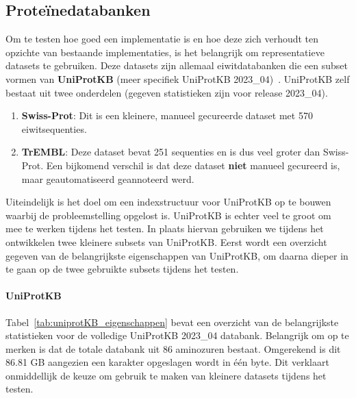\subsection{Proteïnedatabanken}\label{subsec:proteine-databanken}
Om te testen hoe goed een implementatie is en hoe deze zich verhoudt ten opzichte van bestaande implementaties, is het belangrijk om representatieve datasets te gebruiken.
Deze datasets zijn allemaal eiwitdatabanken die een subset vormen van \textbf{UniProtKB} (meer specifiek UniProtKB 2023\_04)~\cite{UniprotKB}.
UniProtKB zelf bestaat uit twee onderdelen (gegeven statistieken zijn voor release 2023\_04).
\begin{enumerate}
    \item \textbf{Swiss-Prot}: Dit is een kleinere, manueel gecureerde dataset met 570 eiwitsequenties.
    \item \textbf{TrEMBL}: Deze dataset bevat 251 sequenties en is dus veel groter dan Swiss-Prot.
    Een bijkomend verschil is dat deze dataset \textbf{niet} manueel gecureerd is, maar geautomatiseerd geannoteerd werd.
\end{enumerate}
Uiteindelijk is het doel om een indexstructuur voor UniProtKB op te bouwen waarbij de probleemstelling opgelost is.
UniProtKB is echter veel te groot om mee te werken tijdens het testen.
In plaats hiervan gebruiken we tijdens het ontwikkelen twee kleinere subsets van UniProtKB\@.
Eerst wordt een overzicht gegeven van de belangrijkste eigenschappen van UniProtKB, om daarna dieper in te gaan op de twee gebruikte subsets tijdens het testen.

\paragraph{UniProtKB}
Tabel~\ref{tab:uniprotKB_eigenschappen} bevat een overzicht van de belangrijkste statistieken voor de volledige UniProtKB 2023\_04 databank.
Belangrijk om op te merken is dat de totale databank uit 86 aminozuren bestaat.
Omgerekend is dit 86.81 GB aangezien een karakter opgeslagen wordt in één byte.
Dit verklaart onmiddellijk de keuze om gebruik te maken van kleinere datasets tijdens het testen.

